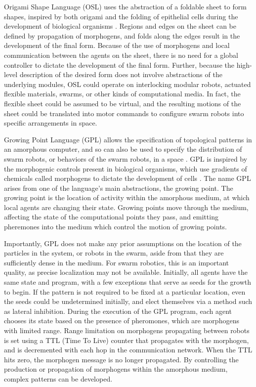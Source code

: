 \documentclass[]{article}
\begin{document}
Origami Shape Language (OSL) uses the abstraction of a foldable sheet to form shapes, inspired by both origami and the folding of epithelial cells during the development of biological organisms \cite{nagpal2004engineering, nagpal2001programmable}.
Regions and edges on the sheet can be defined by propagation of morphogens, and folds along the edges result in the development of the final form.
Because of the use of morphogens and local communication between the agents on the sheet, there is no need for a global controller to dictate the development of the final form. 
Further, because the high-level description of the desired form does not involve abstractions of the underlying modules, OSL could operate on interlocking modular robots, actuated flexible materials, swarms, or other kinds of computational media. 
In fact, the flexible sheet could be assumed to be virtual, and the resulting motions of the sheet could be translated into motor commands to configure swarm robots into specific arrangements in space. 

Growing Point Language (GPL) allows the specification of topological patterns in an amorphous computer, and so can also be used to specify the distribution of swarm robots, or behaviors of the swarm robots, in a space \cite{nagpal2004engineering}. 
GPL is inspired by the morphogenic controls present in biological organisms, which use gradients of chemicals called morphogens to dictate the development of cells \cite{turing1952chemical}.
The name GPL arises from one of the language's main abstractions, the growing point. 
The growing point is the location of activity within the amorphous medium, at which local agents are changing their state. 
Growing points move through the medium, affecting the state of the computational points they pass, and emitting pheremones into the medium which control the motion of growing points.

Importantly, GPL does not make any prior assumptions on the location of the particles in the system, or robots in the swarm, aside from that they are sufficiently dense in the medium. 
For swarm robotics, this is an important quality, as precise localization may not be available. 
Initially, all agents have the same state and program, with a few exceptions that serve as seeds for the growth to begin. 
If the pattern is not required to be fixed at a particular location, even the seeds could be undetermined initially, and elect themselves via a method such as lateral inhibition. 
During the execution of the GPL program, each agent chooses its state based on the presence of pheromones, which are morphogens with limited range. 
Range limitation on morphogens propagating between robots is set using a TTL (Time To Live) counter that propagates with the morphogen, and is decremented with each hop in the communication network. 
When the TTL hits zero, the morphogen message is no longer propagated. 
By controlling the production or propagation of morphogens within the amorphous medium, complex patterns can be developed. 
\end{document}
